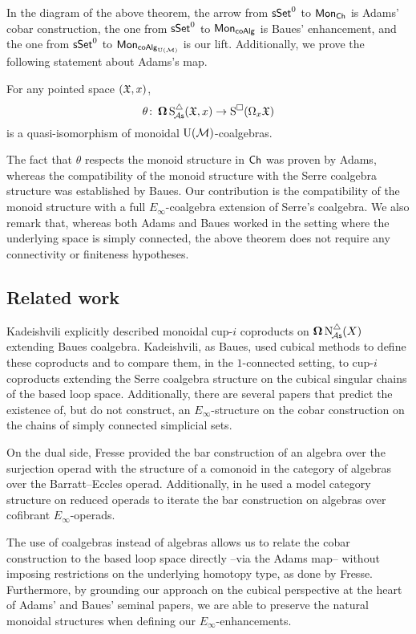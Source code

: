 In the diagram of the above theorem, the arrow from $\mathsf{sSet}^0$ to $\mathsf{Mon}_{\mathsf{Ch}}$ is Adams' cobar construction, the one from $\mathsf{sSet}^0$ to $\mathsf{Mon}_{\mathsf{coAlg}}$ is Baues' enhancement, and the one from $\mathsf{sSet}^0$ to $\mathsf{Mon}_{\mathsf{coAlg}_{{\operatorname{U}(\mathcal{M})}}}$ is our lift.
Additionally, we prove the following statement about Adams's map.

\begin{theorem*}
	For any pointed space $(\mathfrak{X}, x)$,
	\[
	\theta \colon \operatorname{\mathbf{\Omega}} \operatorname{S^{\triangle}_{\!{\mathcal{A}\mathsf{s}}}}(\mathfrak{X}, x) \to \operatorname{S^{\square}}(\Omega_x \mathfrak{X})
	\]
	is a quasi-isomorphism of monoidal ${\operatorname{U}(\mathcal{M})}$-coalgebras.
\end{theorem*}

The fact that $\theta$ respects the monoid structure in $\mathsf{Ch}$ was proven by Adams, whereas the compatibility of the monoid structure with the Serre coalgebra structure was established by Baues.
Our contribution is the compatibility of the monoid structure with a full $E_\infty$-coalgebra extension of Serre's coalgebra.
We also remark that, whereas both Adams and Baues worked in the setting where the underlying space is simply connected, the above theorem does not require any connectivity or finiteness hypotheses.

\subsection*{Related work}

Kadeishvili \cite{kadeishvili1999coproducts, kadeishvili2003cupi} explicitly described monoidal cup-$i$ coproducts on $\operatorname{\mathbf{\Omega}} \operatorname{N^{\triangle}_{\!{\mathcal{A}\mathsf{s}}}}(X)$ extending Baues coalgebra.
Kadeishvili, as Baues, used cubical methods to define these coproducts and to compare them, in the $1$-connected setting, to cup-$i$ coproducts extending the Serre coalgebra structure on the cubical singular chains of the based loop space.
Additionally, there are several papers \cite{smirnov1990iterated, smith1994cobar, smith2000operads, kadeishvili1998iterating} that predict the existence of, but do not construct, an $E_\infty$-structure on the cobar construction on the chains of simply connected simplicial sets.

On the dual side, Fresse \cite{fresse2003hopf} provided the bar construction of an algebra over the surjection operad with the structure of a comonoid in the category of algebras over the Barratt--Eccles operad.
Additionally, in \cite{fresse2010bar} he used a model category structure on reduced operads \cite{berger2003modelcategory, hinich1997homologicalalgebra} to iterate the bar construction on algebras over cofibrant $E_\infty$-operads.

The use of coalgebras instead of algebras allows us to relate the cobar construction to the based loop space directly --via the Adams map-- without imposing restrictions on the underlying homotopy type, as done by Fresse.
Furthermore, by grounding our approach on the cubical perspective at the heart of Adams' and Baues' seminal papers, we are able to preserve the natural monoidal structures when defining our $E_\infty$-enhancements.